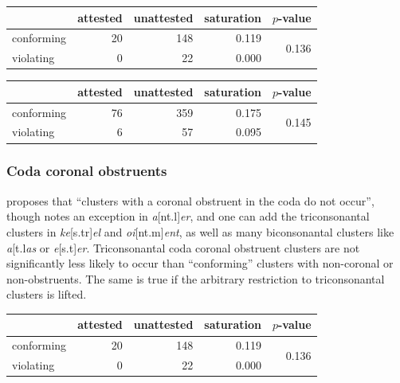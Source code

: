 \begin{example}
\begin{tabular}{l r r r r}
\toprule
           & attested & unattested & saturation & $p$-value              \\
\midrule
conforming & 20       & 148        & 0.119      & \multirow{2}{*}{0.136} \\
violating  &  0       &  22        & 0.000                               \\
\bottomrule
\end{tabular}
\end{example}

\begin{example}
\begin{tabular}{l r r r r}
\toprule
           & attested & unattested & saturation & $p$-value \\
\midrule
conforming & 76 & 359 & 0.175 & \multirow{2}{*}{0.145} \\
violating  &  6 &  57 & 0.095 \\
\bottomrule
\end{tabular}
\end{example}

\subsubsection{Coda coronal obstruents}

\citet[][175]{Pierrehumbert1994} proposes that ``clusters with a coronal obstruent in the coda do not occur'', though \citet{Pierrehumbert1994} notes an exception in \emph{a}[nt.l]\emph{er}, and one can add the triconsonantal clusters in \emph{ke}[s.tr]\emph{el} and \emph{oi}[nt.m]\emph{ent}, as well as many biconsonantal clusters like \emph{a}[t.l\emph{as} or \emph{e}[s.t]\emph{er}. Triconsonantal coda coronal obstruent clusters are not significantly less likely to occur than ``conforming'' clusters with non-coronal or non-obstruents. The same is true if the arbitrary restriction to triconsonantal clusters is lifted.

\begin{example}
\begin{tabular}{l r r r r}
\toprule
           & attested & unattested & saturation & $p$-value              \\
\midrule
conforming & 20       & 148        & 0.119      & \multirow{2}{*}{0.136} \\
violating  & 0        & 22         & 0.000                               \\
\bottomrule
\end{tabular}
\end{example}

